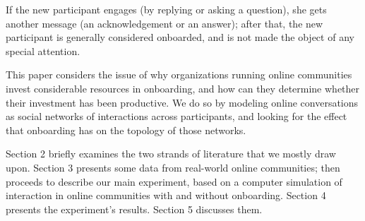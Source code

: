 If the new participant engages (by replying or asking a question), she gets another message (an acknowledgement or an answer); after that, the new participant is generally considered onboarded, and is not made the object of any special attention.

This paper considers the issue of why organizations running online communities invest considerable resources in onboarding, and how can they determine whether their investment has been productive. We do so by modeling online conversations as social networks of interactions across participants, and looking for the effect that onboarding has on the topology of those networks.

Section 2 briefly examines the two strands of literature that we mostly draw upon. Section 3 presents some data from real-world online communities; then proceeds to describe our main experiment, based on a computer simulation of interaction in online communities with and without onboarding. Section 4 presents the experiment's results. Section 5 discusses them.
